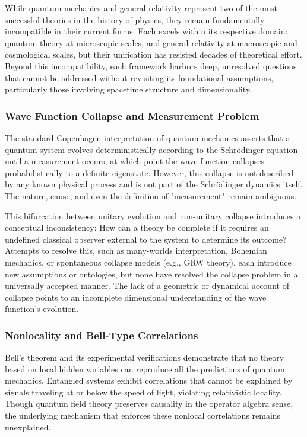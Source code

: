 \documentclass[12pt]{article}
\begin{document}
While quantum mechanics and general relativity represent two of the most successful theories in the history of physics, they remain fundamentally incompatible in their current forms. Each excels within its respective domain: quantum theory at microscopic scales, and general relativity at macroscopic and cosmological scales, but their unification has resisted decades of theoretical effort. Beyond this incompatibility, each framework harbors deep, unresolved questions that cannot be addressed without revisiting its foundational assumptions, particularly those involving spacetime structure and dimensionality.

\subsubsection*{Wave Function Collapse and Measurement Problem}

The standard Copenhagen interpretation of quantum mechanics asserts that a quantum system evolves deterministically according to the Schrödinger equation until a measurement occurs, at which point the wave function collapses probabilistically to a definite eigenstate. However, this collapse is not described by any known physical process and is not part of the Schrödinger dynamics itself. The nature, cause, and even the definition of "measurement" remain ambiguous.

This bifurcation between unitary evolution and non-unitary collapse introduces a conceptual inconsistency: How can a theory be complete if it requires an undefined classical observer external to the system to determine its outcome? Attempts to resolve this, such as many-worlds interpretation, Bohemian mechanics, or spontaneous collapse models (e.g., GRW theory), each introduce new assumptions or ontologies, but none have resolved the collapse problem in a universally accepted manner. The lack of a geometric or dynamical account of collapse points to an incomplete dimensional understanding of the wave function’s evolution.

\subsubsection*{Nonlocality and Bell-Type Correlations}

Bell’s theorem and its experimental verifications demonstrate that no theory based on local hidden variables can reproduce all the predictions of quantum mechanics. Entangled systems exhibit correlations that cannot be explained by signals traveling at or below the speed of light, violating relativistic locality. Though quantum field theory preserves causality in the operator algebra sense, the underlying mechanism that enforces these nonlocal correlations remains unexplained.
\end{document}
